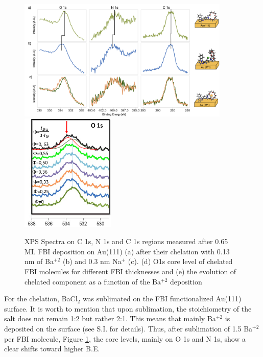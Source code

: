 \documentclass[aps,prl,reprint,longbibliography,superscriptaddress]{revtex4-1}
\def\BaCl{BaCl$_2$ }
\def\Ba{Ba$^{+2}$ }
\def\Na{Na$^{+}$ }
\begin{document}
\begin{figure}[ht!]
	\includegraphics[width=0.9\textwidth]{figures/fig2_xps_chelation.a).png}
	\includegraphics[width=0.4\textwidth]{XPS_O1s_evolution_Au.png}
	
	\caption{\label{XPS_FBI_Au(111)} 
    XPS Spectra on C 1s, N 1s and C 1s regions measured after 0.65 ML FBI deposition on Au(111) (a) after their chelation with 0.13 nm of \Ba (b) and 0.3 nm \Na (c). (d) O1s core level of chelated FBI molecules for different FBI thicknesses and (e) the evolution of chelated component as a function of the \Ba deposition}
\end{figure}  

For the chelation, \BaCl was sublimated on the FBI functionalized Au(111) surface. It is worth to mention that upon sublimation, the stoichiometry of the salt does not remain 1:2 but rather 2:1. This means that mainly \Ba is deposited on the surface (see S.I. for details).
Thus, after sublimation of 1.5 \Ba per FBI molecule, Figure \ref{XPS_FBI_Au(111)}, the core levels, mainly on O 1s and N 1s, show a clear shifts toward higher B.E.
\end{document}
